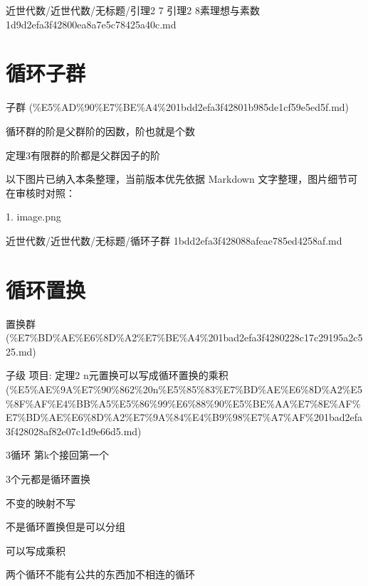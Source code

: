 \begin{note}[来源路径]

近世代数/近世代数/无标题/引理2 7 引理2 8素理想与素数 1d9d2efa3f42800ea8a7e5c78425a40c.md

\end{note}

\section*{循环子群}

\begin{note}[来源上级主题]

子群 (\%E5\%AD\%90\%E7\%BE\%A4\%201bdd2efa3f42801b985de1cf59e5ed5f.md)

\end{note}

\begin{note}[循环子群]

循环群的阶是父群阶的因数，阶也就是个数

定理3有限群的阶都是父群因子的阶

\end{note}

\begin{note}[关联图片]
以下图片已纳入本条整理，当前版本优先依据 Markdown 文字整理，图片细节可在审核时对照：

1. image.png\\

\end{note}

\begin{note}[来源路径]

近世代数/近世代数/无标题/循环子群 1bdd2efa3f428088afeae785ed4258af.md

\end{note}

\section*{循环置换}

\begin{note}[来源上级主题]

置换群 (\%E7\%BD\%AE\%E6\%8D\%A2\%E7\%BE\%A4\%201bad2efa3f4280228c17c29195a2c525.md)

\end{note}

\begin{note}[循环置换]

子级 项目: 定理2 n元置换可以写成循环置换的乘积 (\%E5\%AE\%9A\%E7\%90\%862\%20n\%E5\%85\%83\%E7\%BD\%AE\%E6\%8D\%A2\%E5\%8F\%AF\%E4\%BB\%A5\%E5\%86\%99\%E6\%88\%90\%E5\%BE\%AA\%E7\%8E\%AF\%E7\%BD\%AE\%E6\%8D\%A2\%E7\%9A\%84\%E4\%B9\%98\%E7\%A7\%AF\%201bad2efa3f428028af82e07c1d9e66d5.md)

3循环 第k个接回第一个

3个元都是循环置换

不变的映射不写

不是循环置换但是可以分组

可以写成乘积

两个循环不能有公共的东西加不相连的循环

\end{note}

